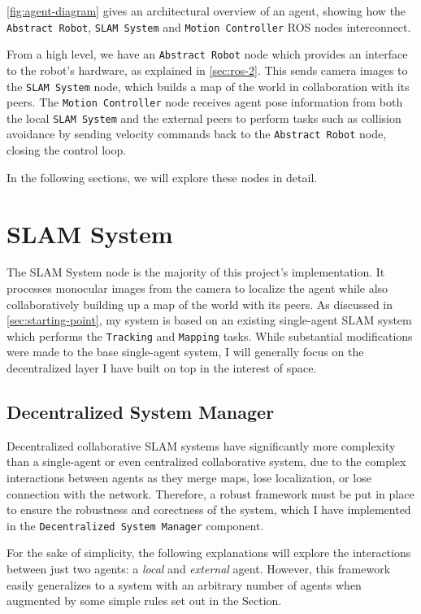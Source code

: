 \autoref{fig:agent-diagram} gives an architectural overview of an agent, showing how the \texttt{Abstract Robot}, \texttt{SLAM System} and \texttt{Motion Controller} ROS nodes interconnect.

From a high level, we have an \texttt{Abstract Robot} node which provides an interface to the robot's hardware, as explained in \autoref{sec:ros-2}. This sends camera images to the \texttt{SLAM System} node, which builds a map of the world in collaboration with its peers. The \texttt{Motion Controller} node receives agent pose information from both the local \texttt{SLAM System} and the external peers to perform tasks such as collision avoidance by sending velocity commands back to the \texttt{Abstract Robot} node, closing the control loop.

In the following sections, we will explore these nodes in detail.

\section{SLAM System}
\label{sec:slam-system}
The SLAM System node is the majority of this project's implementation. It processes monocular images from the camera to localize the agent while also collaboratively building up a map of the world with its peers. As discussed in \autoref{sec:starting-point}, my system is based on an existing single-agent SLAM system which performs the \texttt{Tracking} and \texttt{Mapping} tasks. While substantial modifications were made to the base single-agent system, I will generally focus on the decentralized layer I have built on top in the interest of space.

\subsection{Decentralized System Manager}
\label{sec:decentralized-system-manager}
Decentralized collaborative SLAM systems have significantly more complexity than a single-agent or even centralized collaborative system, due to the complex interactions between agents as they merge maps, lose localization, or lose connection with the network. Therefore, a robust framework must be put in place to ensure the robustness and corectness of the system, which I have implemented in the \texttt{Decentralized System Manager} component.

For the sake of simplicity, the following explanations will explore the interactions between just two agents: a \textit{local} and \textit{external} agent. However, this framework easily generalizes to a system with an arbitrary number of agents when augmented by some simple rules set out in the \textit{} Section.


